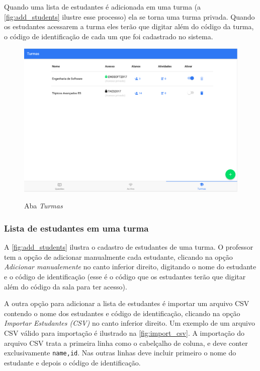 Quando uma lista de estudantes é adicionada em uma turma (a \autoref{fig:add_students} ilustre esse processo) ela se
torna uma turma privada. Quando os estudantes acessarem a turma eles terão que
digitar além do código da turma, o código de identificação de cada um que foi cadastrado no sistema.

\begin{figure}[ht]
  \centering
  \caption{Aba \textit{Turmas}}
  \includegraphics[scale=.4]{imagens/telas/admin_classes}
  \doautor
  \label{fig:admin_classes}
\end{figure}

\subsubsection{Lista de estudantes em uma turma}

A \autoref{fig:add_students} ilustra o cadastro de estudantes de uma turma.
O professor tem a opção de adicionar manualmente cada estudante, clicando
na opção \textit{Adicionar manualemente} no canto inferior direito, digitando
o nome do estudante e o código de identificação (esse é o código que os estudantes
terão que digitar além do código da sala para ter acesso).

A outra opção para adicionar a lista de estudantes é importar um arquivo CSV
contendo o nome dos estudantes e código de identificação, clicando
na opção \textit{Importar Estudantes (CSV)} no canto inferior direito. Um exemplo de um
arquivo CSV válido para importação é ilustrado na \autoref{fig:import_csv}.
A importação do arquivo CSV trata a primeira linha como o cabelçalho de coluna,
e deve conter exclusivamente \texttt{name,id}. Nas outras linhas deve incluir
primeiro o nome do estudante e depois o código de identificação.

